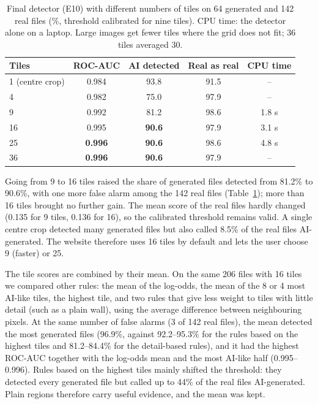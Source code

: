 \documentclass{mnnit}
\begin{document}
\begin{table}[htbp]
\centering
\caption[Final detector (E10) with different numbers of tiles on 64 generated and 142 real files (\%, threshold calibrated for nine tiles)]{Final detector (E10) with different numbers of tiles on 64 generated and 142 real files (\%, threshold calibrated for nine tiles). CPU time: the detector alone on a laptop. Large images get fewer tiles where the grid does not fit; 36 tiles averaged 30.}
\label{tab:tiles}
\small
\begin{tabular}{lcccc}
\toprule
\textbf{Tiles} & \textbf{\mbox{ROC-AUC}} & \textbf{AI detected} & \textbf{Real as real} & \textbf{CPU time}\\
\midrule
1 (centre crop) & 0.984 & 93.8 & 91.5 & --\\
4 & 0.982 & 75.0 & 97.9 & --\\
9 & 0.992 & 81.2 & 98.6 & 1.8 s\\
16 & 0.995 & \textbf{90.6} & 97.9 & 3.1 s\\
25 & \textbf{0.996} & \textbf{90.6} & 98.6 & 4.8 s\\
36 & \textbf{0.996} & \textbf{90.6} & 97.9 & --\\
\bottomrule
\end{tabular}
\end{table}

Going from 9 to 16 tiles raised the share of generated files detected
from 81.2\% to 90.6\%, with one more false alarm among the 142 real files
(Table~\ref{tab:tiles}); more than 16 tiles brought no further gain. The
mean score of the real files hardly changed (0.135 for 9 tiles, 0.136 for
16), so the calibrated threshold remains valid. A single centre crop
detected many generated files but also called 8.5\% of the real files
AI-generated. The website therefore uses 16 tiles by default and lets the
user choose 9 (faster) or 25.

The tile scores are combined by their mean. On the same 206 files with
16 tiles we compared other rules: the mean of the log-odds, the mean of
the 8 or 4 most AI-like tiles, the highest tile, and two rules that give
less weight to tiles with little detail (such as a plain wall), using
the average difference between neighbouring pixels. At the same number
of false alarms (3 of 142 real files), the mean detected the most
generated files (96.9\%, against 92.2--95.3\% for the rules based on the
highest tiles and 81.2--84.4\% for the detail-based rules), and it had
the highest \mbox{ROC-AUC} together with the log-odds mean and the most AI-like
half (0.995--0.996). Rules based on the highest tiles mainly shifted the
threshold: they detected every generated file but called up to 44\% of
the real files AI-generated. Plain regions therefore carry useful
evidence, and the mean was kept.
\end{document}
